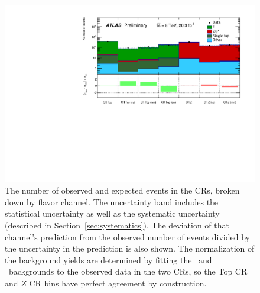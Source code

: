 \begin{figure}[ht]
  \centering
  \includegraphics[width=\textwidth]{figs/blstop/histpull_CR_detailed.pdf}
  \caption[
    The number of observed and expected events in the CRs,
    broken down by flavor channel.
    The deviation of that channel's prediction from the observed number of
    events divided by the uncertainty in the prediction is also shown.
  ]{
    The number of observed and expected events in the CRs,
    broken down by flavor channel.
    The uncertainty band includes the statistical uncertainty as well as the
    systematic uncertainty (described in Section~\ref{sec:systematics}).
    The deviation of that channel's prediction from the observed number of
    events divided by the uncertainty in the prediction is also shown.
    The normalization of the background yields are determined
    by fitting the \TTBAR\ and \ZGAMMAJETS\ backgrounds to the observed
    data in the two CRs, so the Top CR and $Z$ CR bins have perfect agreement
    by construction.
  }
  \label{fig:pull_dist_cr}
\end{figure}

